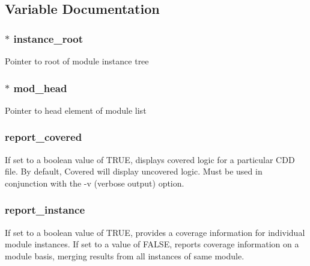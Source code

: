 \subsection{Variable Documentation}
\subsubsection{$\ast$ instance\_\-root}\label{toggle_8c_a0}


Pointer to root of module instance tree 
\subsubsection{$\ast$ mod\_\-head}\label{toggle_8c_a1}


Pointer to head element of module list 
\subsubsection{ report\_\-covered}\label{toggle_8c_a2}


If set to a boolean value of TRUE, displays covered logic for a particular CDD file. By default, Covered will display uncovered logic. Must be used in conjunction with the -v (verbose output) option. 
\subsubsection{ report\_\-instance}\label{toggle_8c_a3}


If set to a boolean value of TRUE, provides a coverage information for individual module instances. If set to a value of FALSE, reports coverage information on a module basis, merging results from all instances of same module. 